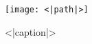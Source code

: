 \begin{figure}[h]
    \label{<|name|>}
    \texttt{[image: <|path|>]}
    \caption{<|caption|>}
    \centering
\end{figure}

